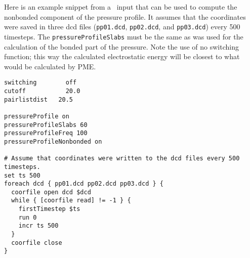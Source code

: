 Here is an example snippet from a \NAMD\ input that can be used to compute
the nonbonded component of the pressure profile.  It assumes that the 
coordinates were saved in three dcd files ({\tt pp01.dcd}, {\tt pp02.dcd},
and {\tt pp03.dcd}) every 500 timesteps.  The {\tt pressureProfileSlabs}
must be the same as was used for the calculation of the bonded part of
the pressure.  Note the use of no switching function; this way the calculated
electrostatic energy will be closest to what would be calculated by PME.
\begin{verbatim}
switching	     off
cutoff		     20.0
pairlistdist   20.5

pressureProfile	on
pressureProfileSlabs 60 
pressureProfileFreq 100 
pressureProfileNonbonded on

# Assume that coordinates were written to the dcd files every 500 timesteps.
set ts 500
foreach dcd { pp01.dcd pp02.dcd pp03.dcd } {
  coorfile open dcd $dcd
  while { [coorfile read] != -1 } {
    firstTimestep $ts 
    run 0 
    incr ts 500
  }
  coorfile close
}
\end{verbatim}

